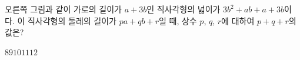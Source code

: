 \noindent\begin{minipage}[t]{0.58\linewidth}\vspace{0pt}\raggedright 오른쪽 그림과 같이 가로의 길이가 $a+3b$인 직사각형의 넓이가 $3b^2+ab+a+3b$이다. 이 직사각형의 둘레의 길이가 $pa+qb+r$일 때, 상수 $p$, $q$, $r$에 대하여 $p+q+r$의 값은?\end{minipage}\hfill\begin{minipage}[t]{0.4\linewidth}\vspace{0pt}\centering \resizebox{\ifdim\width>\linewidth\linewidth\else\width\fi}{!}{}\end{minipage}\par
\begin{choices32}{$8$}{$9$}{$10$}{$11$}{$12$}\end{choices32}
